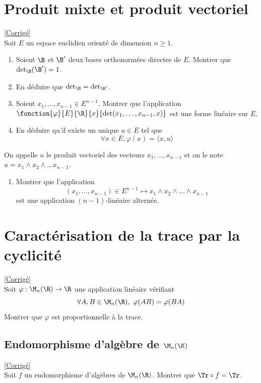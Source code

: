 \documentclass[8pt]{book}
\begin{document}
\section{Produit mixte et produit vectoriel }
\label{Produit mixte et produit vectoriel}
\textcolor{blue}{\hyperref[Produit mixte et produit vectoriel corrigé]{[Corrigé]}}\\
Soit $E$ un espace euclidien orienté de dimension $n\geq1$.
\begin{enumerate}
	\item Soient $\B$ et $\B'$ deux bases orthonormées directes de $E$. Montrer que $\det_\B(\B')=1$.
	\item En déduire que $\det_\B=\det_{\B'}$.
	\item Soient $x_1,\dots,x_{n-1}\in E^{n-1}$. Montrer que l'application $\fonction{\varphi}{E}{\R}{x}{\det(x_1,\dots,x_{n-1},x)}$ est une forme linéaire sur $E$.
	\item En déduire qu'il existe un unique $u\in E$ tel que $$\forall x\in E, \varphi(x)=\langle x,u\rangle$$
\end{enumerate}
On appelle $u$ le produit vectoriel des vecteurs $x_1,\dots, x_{n-1}$ et on le note $u=x_1\wedge x_2\wedge\dots x_{n-1}$.
\begin{enumerate}[resume]
	\item Montrer que l'application $$(x_1,\dots,x_{n-1})\in E^{n-1}\mapsto x_1\wedge x_2\wedge\dots\wedge x_{n-1}$$ est une application $(n-1)$-linéaire alternée.
\end{enumerate}

\section{Caractérisation de la trace par la cyclicité }
\label{Caractérisation de la trace par la cyclicité}
\textcolor{blue}{\hyperref[Caractérisation de la trace par la cyclicité corrigé]{[Corrigé]}}\\
Soit $\varphi:\M_n(\R)\to\R$ une application linéaire vérifiant
$$\forall A,B\in \M_n(\R),\ \varphi(AB)=\varphi(BA)$$
Montrer que $\varphi$ est proportionnelle à la trace.

\subsection{Endomorphisme d'algèbre de $\M_n(\K)$ }
\label{Endomorphisme d'algèbre de Mn(R)}
\textcolor{blue}{\hyperref[Endomorphisme d'algèbre de Mn(R) corrigé]{[Corrigé]}}\\
Soit $f$ un endomorphisme d'algèbres de $\M_n(\R)$. Montrer que $\Tr\circ f=\Tr$.
\end{document}
